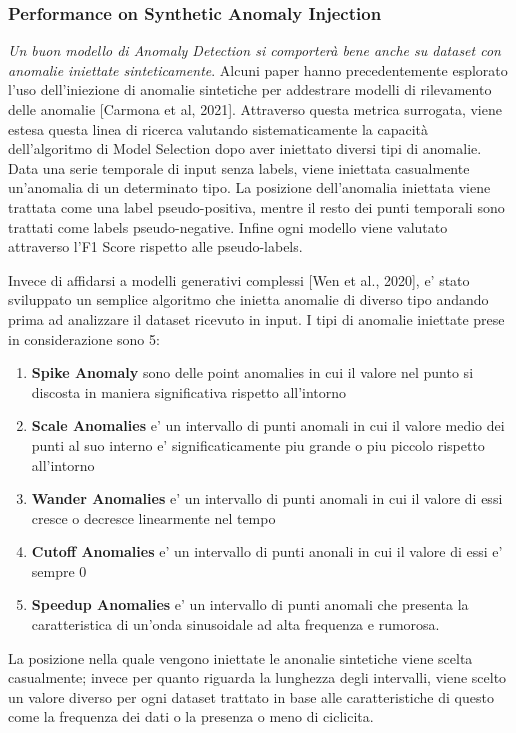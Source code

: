 \subsubsection{Performance on Synthetic Anomaly Injection}
\textit{Un buon modello di Anomaly Detection si comporterà bene anche su dataset con anomalie iniettate sinteticamente}. Alcuni paper hanno precedentemente esplorato l'uso dell'iniezione di anomalie sintetiche per addestrare
modelli di rilevamento delle anomalie [Carmona et al,
2021]. Attraverso questa metrica surrogata, viene estesa questa linea di ricerca
valutando sistematicamente la capacità dell'algoritmo di Model Selection dopo aver iniettato diversi tipi di anomalie. Data una serie temporale di input senza labels, viene iniettata casualmente un'anomalia di un determinato tipo. La posizione dell'anomalia iniettata viene trattata come una label pseudo-positiva, mentre il resto dei punti temporali sono trattati come labels pseudo-negative. 
Infine ogni modello viene valutato attraverso l'F1 Score rispetto alle pseudo-labels.

Invece di affidarsi a modelli generativi complessi [Wen et al., 2020], e' stato sviluppato un semplice algoritmo che inietta anomalie di diverso tipo andando prima ad analizzare il dataset ricevuto in input. I tipi di anomalie iniettate prese in considerazione sono 5: 
\begin{enumerate}
\item \textbf{Spike Anomaly} sono delle point anomalies in cui il valore nel punto si discosta in maniera significativa rispetto all'intorno
\item \textbf{Scale Anomalies} e' un intervallo di punti anomali in cui il  valore medio dei punti al suo interno e' significaticamente piu grande o piu piccolo rispetto all'intorno
\item \textbf{Wander Anomalies} e' un intervallo di punti anomali in cui il valore di essi cresce o decresce linearmente nel tempo
\item \textbf{Cutoff Anomalies} e' un intervallo di punti anonali in cui il valore di essi e' sempre 0
\item \textbf{Speedup Anomalies} e' un intervallo di punti anomali che presenta la caratteristica di un'onda sinusoidale ad alta frequenza e rumorosa.
\end{enumerate}
La posizione nella quale vengono iniettate le anonalie sintetiche viene scelta casualmente; invece per quanto riguarda la lunghezza degli intervalli, viene scelto un valore diverso per ogni dataset trattato in base alle caratteristiche di questo come la frequenza dei dati o la presenza o meno di ciclicita.

